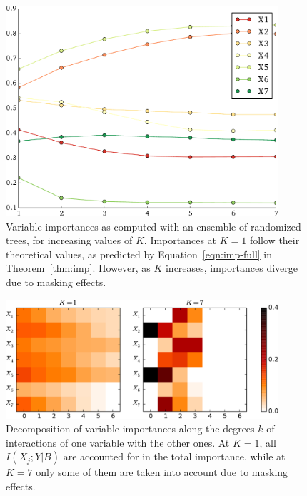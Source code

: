 \begin{figure}
    \centering
    \includegraphics[width=0.9\textwidth]{figures/ch6_order.pdf}
    \caption{Variable importances as computed with an ensemble of randomized trees, for increasing values of $K$. Importances at $K=1$ follow their theoretical values, as predicted by Equation~\ref{eqn:imp-full} in Theorem~\ref{thm:imp}. However, as $K$ increases,  importances diverge due to masking effects.}
    \label{fig:order}
\end{figure}

\begin{figure}
    \centering
    \includegraphics[width=0.9\textwidth]{figures/ch6_imp_led.pdf}
    \caption{Decomposition of variable importances along the degrees $k$ of interactions of one variable with the other ones. At $K=1$, all $I(X_j;Y|B)$ are accounted for in the total importance, while at $K=7$ only some of them are taken into account due to masking effects.}
    \label{fig:decomposition}
\end{figure}

